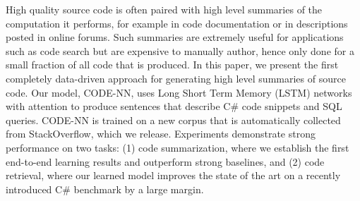 High quality source code is often paired with high level summaries of the computation it performs, for example in code documentation or in descriptions posted in online forums. Such summaries are extremely useful for applications such as code search but are expensive to manually author, hence only done for a small fraction of all code that is produced. In this paper, we present the first completely data-driven approach for generating high level summaries of source code. Our model, CODE-NN, uses Long Short Term Memory (LSTM) networks with attention to produce sentences that describe C\# code snippets and SQL queries. CODE-NN is trained on a new corpus that is automatically collected from StackOverflow, which we release. Experiments demonstrate strong performance on two tasks: (1) code summarization, where we establish the first end-to-end learning results and outperform strong baselines, and (2) code retrieval, where our learned model improves the state of the art on a recently introduced C\# benchmark by a large margin.
